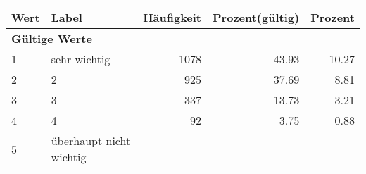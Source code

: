      \begin{longtable}{lXrrr}
     \toprule
     \textbf{Wert} & \textbf{Label} & \textbf{Häufigkeit} & \textbf{Prozent(gültig)} & \textbf{Prozent} \\
     \endhead
     \midrule
     \multicolumn{5}{l}{\textbf{Gültige Werte}}\\

     1 &
     \multicolumn{1}{X}{ sehr wichtig   } &


       \num{1078} &
       \num[round-mode=places,round-precision=2]{43.93} &
         \num[round-mode=places,round-precision=2]{10.27} \\

     2 &
     \multicolumn{1}{X}{ 2   } &


       \num{925} &
       \num[round-mode=places,round-precision=2]{37.69} &
         \num[round-mode=places,round-precision=2]{8.81} \\

     3 &
     \multicolumn{1}{X}{ 3   } &


       \num{337} &
       \num[round-mode=places,round-precision=2]{13.73} &
         \num[round-mode=places,round-precision=2]{3.21} \\

     4 &
     \multicolumn{1}{X}{ 4   } &


       \num{92} &
       \num[round-mode=places,round-precision=2]{3.75} &
         \num[round-mode=places,round-precision=2]{0.88} \\

     5 &
     \multicolumn{1}{X}{ überhaupt nicht wichtig   } &



\end{longtable}
